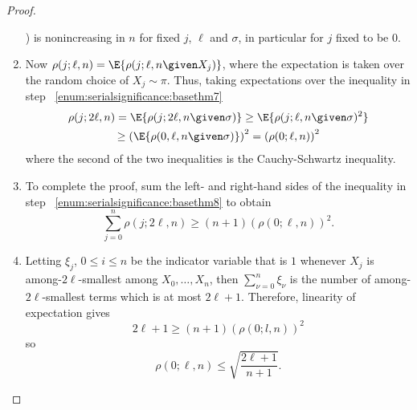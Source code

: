 \documentclass[12pt]{article}
\begin{document}
\begin{proof}
\begin{enumerate}
            \sigma) \) is nonincreasing in \( n \) for fixed \( j \), \(
            \ell \) and \( \sigma \), in particular for \( j \) fixed to
            be \( 0 \).
        \item
            \label{enum:serialsignificance:basethm8} Now \( \rho(j;\ell,n) =
            \E{\rho(j; \ell, n \given X_j)} \), where the expectation is
            taken over the random choice of \( X_j \sim \pi \).  Thus,
            taking expectations over the inequality in step~%
            \ref{enum:serialsignificance:basethm7}
            \begin{multline}
                \rho(j; 2\ell, n) = \E{\rho(j; 2\ell, n \given \sigma)}
                \ge \E{\rho(j; \ell, n \given \sigma)^2} \\
                \ge \left( \E{\rho(0, \ell, n \given \sigma)}\right)^2 =
                \left( \rho(0; \ell, n) \right)^2
            \end{multline}
            where the second of the two inequalities is the
            Cauchy-Schwartz inequality.
        \item
            To complete the proof, sum the left- and right-hand sides of
            the inequality in step~%
            \ref{enum:serialsignificance:basethm8} to obtain
            \[
                \sum\limits_{j=0}^n \rho(j; 2\ell, n) \ge (n+1) (\rho(0;
                \ell, n))^2.
            \]
        \item
            Letting \( \xi_j \), \( 0 \le i \le n \) be the indicator
            variable that is \( 1 \) whenever \( X_j \) is among-\( 2\ell
            \)-smallest among \( X_0, \dots , X_n \), then \( \sum_{\nu=0}^n
            \xi_{\nu} \) is the number of among-\( 2\ell \)-smallest
            terms which is at most \( 2\ell + 1 \).  Therefore,
            linearity of expectation gives
            \[
                2\ell + 1 \ge (n + 1)(\rho(0; l,n) )^2
            \] so
            \[
                \rho(0; \ell, n) \le \sqrt{ \frac{2\ell + 1}{n+1}}.
            \]
    \end{enumerate}
\end{proof}
\end{document}
